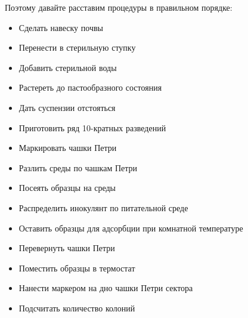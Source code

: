 Поэтому давайте расставим процедуры в правильном порядке:
\begin{itemize}
    \item Сделать навеску почвы
    \item Перенести в стерильную ступку
    \item Добавить стерильной воды
    \item Растереть до пастообразного состояния
    \item Дать суспензии отстояться
    \item Приготовить ряд 10-кратных разведений
    \item Маркировать чашки Петри
    \item Разлить среды по чашкам Петри
    \item Посеять образцы на среды
    \item Распределить инокулянт по питательной среде
    \item Оставить образцы для адсорбции при комнатной температуре
    \item Перевернуть чашки Петри
    \item Поместить образцы в термостат
    \item Нанести маркером на дно чашки Петри сектора
    \item Подсчитать количество колоний
\end{itemize}

